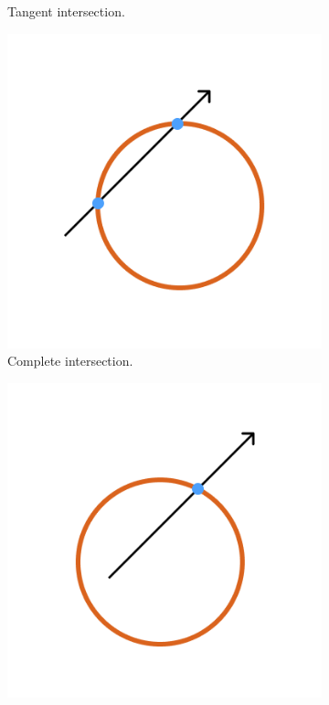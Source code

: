 \documentclass[a4paper,11pt,oneside]{article}
\begin{document}
\begin{figure}[ht]
\begin{subfigure}[b]{0.4\textwidth}
         \caption{Tangent intersection.}
          \label{sec3.1:tangent-intersection}
     \end{subfigure}
     \medskip
     \begin{subfigure}[b]{0.4\textwidth}
         \centering
         \includegraphics[width=\linewidth]{section3/3.1/intersection-in-out.png}
         \caption{Complete intersection.}
         \label{sec3.1:complete-intersection}
     \end{subfigure}
     \hfill
     \begin{subfigure}[b]{0.4\textwidth}
         \centering
         \includegraphics[width=\linewidth]{section3/3.1/intersection-out.png}

\end{subfigure}
\end{figure}
\end{document}
